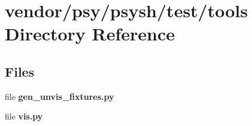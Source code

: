 \section{vendor/psy/psysh/test/tools Directory Reference}
\label{dir_4325bfbc40e995bb581893f44352f6e2}
\subsection*{Files}
\begin{DoxyCompactItemize}
\item 
file {\bf gen\+\_\+unvis\+\_\+fixtures.\+py}
\item 
file {\bf vis.\+py}
\end{DoxyCompactItemize}

